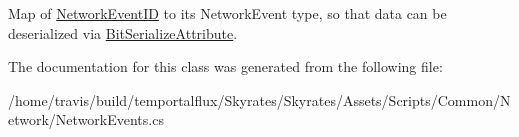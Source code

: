 Map of \hyperlink{namespace_skyrates_1_1_common_1_1_network_a90fc6faa44c44b4284114e861d3e761a}{Network\-Event\-I\-D} to its Network\-Event type, so that data can be deserialized via \hyperlink{class_skyrates_1_1_common_1_1_network_1_1_bit_serialize_attribute}{Bit\-Serialize\-Attribute}. 



The documentation for this class was generated from the following file\-:\begin{DoxyCompactItemize}
\item 
/home/travis/build/temportalflux/\-Skyrates/\-Skyrates/\-Assets/\-Scripts/\-Common/\-Network/Network\-Events.\-cs\end{DoxyCompactItemize}
